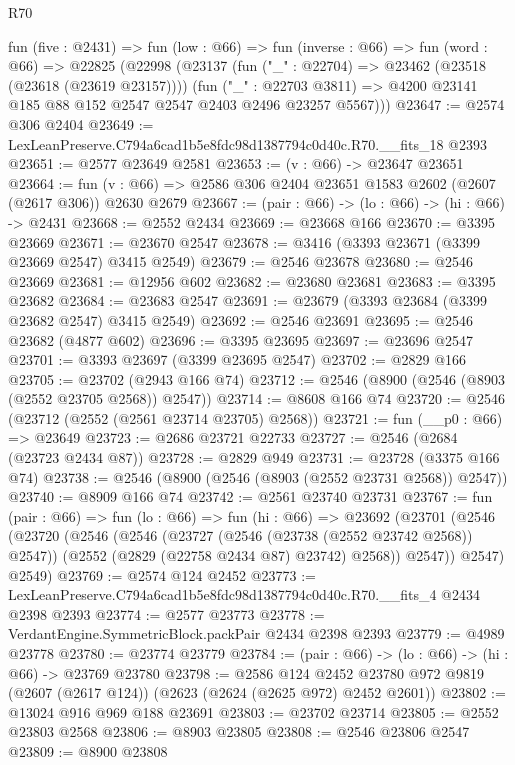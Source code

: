 \begin{lexlean}{R70}
\begin{coremodule}
  fun (five : @2431) =>
  fun (low : @66) =>
  fun (inverse : @66) =>
  fun (word : @66) =>
  @22825
    (@22998
      (@23137
        (fun ("_" : @22704) => @23462 (@23518 (@23618 (@23619 @23157))))
        (fun ("_" : @22703 @3811) =>
        @4200 @23141 @185 @88 @152 @2547 @2547 @2403 @2496 @23257 @5567)))
@23647 := @2574 @306 @2404
@23649 := LexLeanPreserve.C794a6cad1b5e8fdc98d1387794c0d40c.R70.__fits_18 @2393
@23651 := @2577 @23649 @2581
@23653 := (v : @66) -> @23647 @23651
@23664 := fun (v : @66) => @2586 @306 @2404 @23651 @1583 @2602 (@2607 (@2617 @306)) @2630 @2679
@23667 := (pair : @66) -> (lo : @66) -> (hi : @66) -> @2431
@23668 := @2552 @2434
@23669 := @23668 @166
@23670 := @3395 @23669
@23671 := @23670 @2547
@23678 := @3416 (@3393 @23671 (@3399 @23669 @2547) @3415 @2549)
@23679 := @2546 @23678
@23680 := @2546 @23669
@23681 := @12956 @602
@23682 := @23680 @23681
@23683 := @3395 @23682
@23684 := @23683 @2547
@23691 := @23679 (@3393 @23684 (@3399 @23682 @2547) @3415 @2549)
@23692 := @2546 @23691
@23695 := @2546 @23682 (@4877 @602)
@23696 := @3395 @23695
@23697 := @23696 @2547
@23701 := @3393 @23697 (@3399 @23695 @2547)
@23702 := @2829 @166
@23705 := @23702 (@2943 @166 @74)
@23712 := @2546 (@8900 (@2546 (@8903 (@2552 @23705 @2568)) @2547))
@23714 := @8608 @166 @74
@23720 := @2546 (@23712 (@2552 (@2561 @23714 @23705) @2568))
@23721 := fun (__p0 : @66) => @23649
@23723 := @2686 @23721 @22733
@23727 := @2546 (@2684 (@23723 @2434 @87))
@23728 := @2829 @949
@23731 := @23728 (@3375 @166 @74)
@23738 := @2546 (@8900 (@2546 (@8903 (@2552 @23731 @2568)) @2547))
@23740 := @8909 @166 @74
@23742 := @2561 @23740 @23731
@23767 := fun (pair : @66) =>
  fun (lo : @66) =>
  fun (hi : @66) =>
  @23692
    (@23701
      (@2546
        (@23720
          (@2546
            (@2546
              (@23727 (@2546 (@23738 (@2552 @23742 @2568)) @2547))
              (@2552 (@2829 (@22758 @2434 @87) @23742) @2568))
            @2547))
        @2547)
      @2549)
@23769 := @2574 @124 @2452
@23773 := LexLeanPreserve.C794a6cad1b5e8fdc98d1387794c0d40c.R70.__fits_4 @2434 @2398 @2393
@23774 := @2577 @23773
@23778 := VerdantEngine.SymmetricBlock.packPair @2434 @2398 @2393
@23779 := @4989 @23778
@23780 := @23774 @23779
@23784 := (pair : @66) -> (lo : @66) -> (hi : @66) -> @23769 @23780
@23798 := @2586
    @124
    @2452
    @23780
    @972
    @9819
    (@2607 (@2617 @124))
    (@2623 (@2624 (@2625 @972) @2452 @2601))
@23802 := @13024 @916 @969 @188 @23691
@23803 := @23702 @23714
@23805 := @2552 @23803 @2568
@23806 := @8903 @23805
@23808 := @2546 @23806 @2547
@23809 := @8900 @23808

\end{coremodule}
\end{lexlean}
